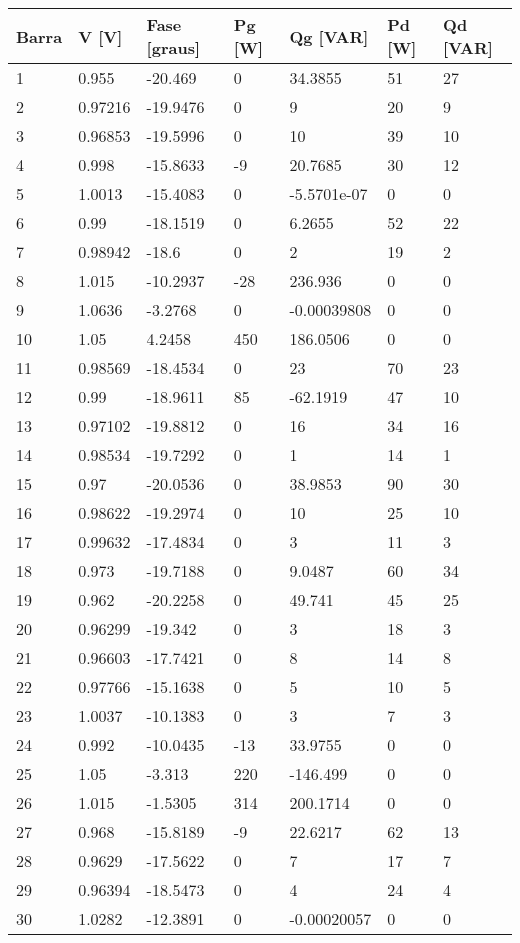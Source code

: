 \begin{tabular}{|l|l|l|l|l|l|l|}
\hline
\textbf{Barra}&\textbf{V [V]}&\textbf{Fase [graus]}&\textbf{Pg [W]}&\textbf{Qg [VAR]}&\textbf{Pd [W]}&\textbf{Qd [VAR]}\\\hline
1&0.955&-20.469&0&34.3855&51&27\\\hline
2&0.97216&-19.9476&0&9&20&9\\\hline
3&0.96853&-19.5996&0&10&39&10\\\hline
4&0.998&-15.8633&-9&20.7685&30&12\\\hline
5&1.0013&-15.4083&0&-5.5701e-07&0&0\\\hline
6&0.99&-18.1519&0&6.2655&52&22\\\hline
7&0.98942&-18.6&0&2&19&2\\\hline
8&1.015&-10.2937&-28&236.936&0&0\\\hline
9&1.0636&-3.2768&0&-0.00039808&0&0\\\hline
10&1.05&4.2458&450&186.0506&0&0\\\hline
11&0.98569&-18.4534&0&23&70&23\\\hline
12&0.99&-18.9611&85&-62.1919&47&10\\\hline
13&0.97102&-19.8812&0&16&34&16\\\hline
14&0.98534&-19.7292&0&1&14&1\\\hline
15&0.97&-20.0536&0&38.9853&90&30\\\hline
16&0.98622&-19.2974&0&10&25&10\\\hline
17&0.99632&-17.4834&0&3&11&3\\\hline
18&0.973&-19.7188&0&9.0487&60&34\\\hline
19&0.962&-20.2258&0&49.741&45&25\\\hline
20&0.96299&-19.342&0&3&18&3\\\hline
21&0.96603&-17.7421&0&8&14&8\\\hline
22&0.97766&-15.1638&0&5&10&5\\\hline
23&1.0037&-10.1383&0&3&7&3\\\hline
24&0.992&-10.0435&-13&33.9755&0&0\\\hline
25&1.05&-3.313&220&-146.499&0&0\\\hline
26&1.015&-1.5305&314&200.1714&0&0\\\hline
27&0.968&-15.8189&-9&22.6217&62&13\\\hline
28&0.9629&-17.5622&0&7&17&7\\\hline
29&0.96394&-18.5473&0&4&24&4\\\hline
30&1.0282&-12.3891&0&-0.00020057&0&0\\\hline

\end{tabular}
